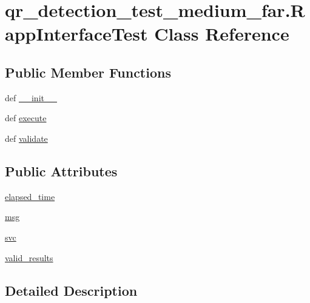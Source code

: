 \hypertarget{classqr__detection__test__medium__far_1_1RappInterfaceTest}{\section{qr\-\_\-detection\-\_\-test\-\_\-medium\-\_\-far.\-Rapp\-Interface\-Test Class Reference}
\label{classqr__detection__test__medium__far_1_1RappInterfaceTest}
}
\subsection*{Public Member Functions}
\begin{DoxyCompactItemize}
\item 
def \hyperlink{classqr__detection__test__medium__far_1_1RappInterfaceTest_a88e8ad9c6927ff15ec0aa1b72ee1c77a}{\-\_\-\-\_\-init\-\_\-\-\_\-}
\item 
def \hyperlink{classqr__detection__test__medium__far_1_1RappInterfaceTest_a910633feee74e58de761bb7531aca9ff}{execute}
\item 
def \hyperlink{classqr__detection__test__medium__far_1_1RappInterfaceTest_afafc365feefd8752b874d62bdd770617}{validate}
\end{DoxyCompactItemize}
\subsection*{Public Attributes}
\begin{DoxyCompactItemize}
\item 
\hyperlink{classqr__detection__test__medium__far_1_1RappInterfaceTest_a2e93baf76cef714feb0d5369b75d8d78}{elapsed\-\_\-time}
\item 
\hyperlink{classqr__detection__test__medium__far_1_1RappInterfaceTest_a0b2b351048e07006d05d587787e9dc9a}{msg}
\item 
\hyperlink{classqr__detection__test__medium__far_1_1RappInterfaceTest_a953084c68fb3ea6082f8a475a9a1a85d}{svc}
\item 
\hyperlink{classqr__detection__test__medium__far_1_1RappInterfaceTest_a0d01001233a4d4e6c5c34396220e0fa8}{valid\-\_\-results}
\end{DoxyCompactItemize}


\subsection{Detailed Description}


